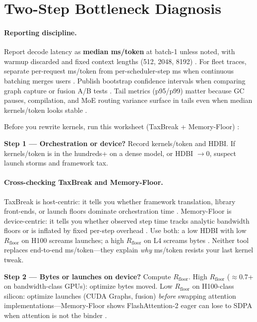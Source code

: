 \section{Two-Step Bottleneck Diagnosis}
\label{sec:diagnosis}

\paragraph{Reporting discipline.}
Report decode latency as \textbf{median ms/token} at batch-1 unless noted, with warmup discarded and fixed context lengths (512, 2048, 8192) \citep{memoryfloor2026}.
For fleet traces, separate per-request ms/token from per-scheduler-step ms when continuous batching merges users \citep{kwon2023vllm,chen2026towardshighgoodput}.
Publish bootstrap confidence intervals when comparing graph capture or fusion A/B tests \citep{memoryfloor2026}.
Tail metrics (p95/p99) matter because GC pauses, compilation, and MoE routing variance surface in tails even when median kernels/token looks stable \citep{taxbreak2026,fan2025ellieenergyefficie}.


Before you rewrite kernels, run this worksheet (TaxBreak + Memory-Floor) \citep{taxbreak2026,memoryfloor2026}:

\textbf{Step 1 --- Orchestration or device?}
Record kernels/token and HDBI.
If kernels/token is in the hundreds+ on a dense model, or HDBI $\to 0$, suspect launch storms and framework tax.


\paragraph{Cross-checking TaxBreak and Memory-Floor.}
TaxBreak is host-centric: it tells you whether framework translation, library front-ends, or launch floors dominate orchestration time \citep{taxbreak2026}.
Memory-Floor is device-centric: it tells you whether observed step time tracks analytic bandwidth floors or is inflated by fixed per-step overhead \citep{memoryfloor2026}.
Use both: a low HDBI with low $R_{\mathrm{floor}}$ on H100 screams launches; a high $R_{\mathrm{floor}}$ on L4 screams bytes \citep{memoryfloor2026,taxbreak2026}.
Neither tool replaces end-to-end ms/token---they explain \emph{why} ms/token resists your last kernel tweak.

\textbf{Step 2 --- Bytes or launches on device?}
Compute $R_{\mathrm{floor}}$.
High $R_{\mathrm{floor}}$ (${\approx}0.7$+ on bandwidth-class GPUs): optimize bytes moved.
Low $R_{\mathrm{floor}}$ on H100-class silicon: optimize launches (CUDA Graphs, fusion) \emph{before} swapping attention implementations---Memory-Floor shows FlashAttention-2 eager can lose to SDPA when attention is not the binder \citep{memoryfloor2026}.

